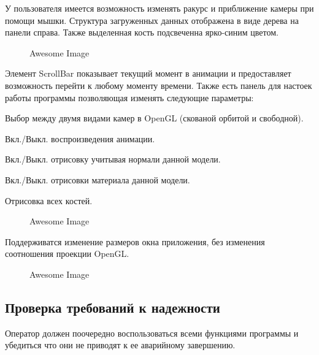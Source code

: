У пользователя имеется возможность изменять ракурс и приближение камеры при помощи мышки. Структура загруженных данных отображена в виде дерева на панели справа. Также выделенная кость подсвеченна ярко-синим цветом.

\begin{figure}[h!]
    \centering
    \caption{Awesome Image}
    \label{fig:awesome_image}
\end{figure}



Элемент ScrollBar показывает текущий момент в анимации и предоставляет 
возможность перейти к любому моменту времени. Также есть панель для настоек работы программы позволяющая изменять следующие параметры:
\begin{my_enumerate}
\item Выбор между двумя видами камер в OpenGL (скованой орбитой и свободной).
\item Вкл./Выкл. воспроизведения анимации.
\item Вкл./Выкл. отрисовку учитывая нормали данной модели.
\item Вкл./Выкл. отрисовки материала данной модели.
\item Отрисовка всех костей.
\end{my_enumerate}


\begin{figure}[h!]
    \centering
    \caption{Awesome Image}
    \label{fig:awesome_image}
\end{figure}


\bigskip

Поддерживатся изменение размеров окна приложения, без изменения соотношения проекции OpenGL.

\begin{figure}[h!]
    \centering
    \caption{Awesome Image}
    \label{fig:awesome_image}
\end{figure}



\subsection{Проверка требований к надежности}
Оператор должен поочередно воспользоваться всеми функциями программы и убедиться что они не приводят к ее аварийному завершению.
